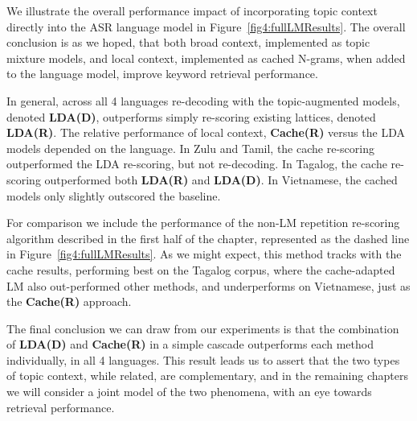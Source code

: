 We illustrate the overall performance impact of incorporating topic context directly into the ASR language model in Figure~\ref{fig4:fullLMResults}.  The overall conclusion is as we hoped, that both broad context, implemented as topic mixture models, and local context, implemented as cached N-grams, when added to the language model, improve keyword retrieval performance.     

In general, across all 4 languages re-decoding with the topic-augmented models, denoted \textbf{LDA(D)}, outperforms simply re-scoring existing lattices, denoted \textbf{LDA(R)}.  The relative performance of local context, \textbf{Cache(R)} versus the LDA models depended on the language.  In Zulu and Tamil, the cache re-scoring outperformed the LDA re-scoring, but not re-decoding.   In Tagalog, the cache re-scoring outperformed both \textbf{LDA(R)} and \textbf{LDA(D)}.  In Vietnamese, the cached models only slightly outscored the baseline. 

For comparison we include the performance of the non-LM repetition re-scoring algorithm described in the first half of the chapter, represented as the dashed line in Figure~\ref{fig4:fullLMResults}.  As we might expect, this method tracks with the cache results, performing best on the Tagalog corpus, where the cache-adapted LM also out-performed other methods, and underperforms on Vietnamese, just as the \textbf{Cache(R)} approach.  %

The final conclusion we can draw from our experiments is that the combination of \textbf{LDA(D)} and \textbf{Cache(R)} in a simple cascade outperforms each method individually, in all 4 languages.  This result leads us to assert that the two types of topic context, while related, are complementary, and in the remaining chapters we will consider a joint model of the two phenomena, with an eye towards retrieval performance.

